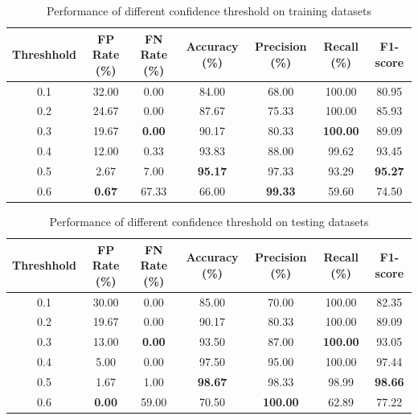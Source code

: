 \documentclass{article}[12pt]
\begin{document}
\begin{table}[H]
    \centering
    \caption{Performance of different confidence threshold on training datasets}
    \begin{tabular}{@{}ccccccc@{}}
    \toprule
    Threshhold & FP Rate (\%)  & FN Rate (\%)  & Accuracy (\%)  & Precision (\%) & Recall (\%)     & F1-score       \\ \midrule
    0.1 & 32.00 & 0.00 & 84.00 & 68.00 & 100.00 & 80.95 \\
    0.2 & 24.67 & 0.00 & 87.67 & 75.33 & 100.00 & 85.93 \\
    0.3        & 19.67         & \textbf{0.00} & 90.17          & 80.33          & \textbf{100.00} & 89.09          \\
    0.4        & 12.00         & 0.33          & 93.83          & 88.00          & 99.62           & 93.45          \\
    0.5        & 2.67          & 7.00          & \textbf{95.17} & 97.33          & 93.29           & \textbf{95.27} \\
    0.6        & \textbf{0.67} & 67.33         & 66.00          & \textbf{99.33} & 59.60           & 74.50          \\ \bottomrule
    \end{tabular}
    \label{tab: yolo_train}
\end{table}

\begin{table}[H]
    \centering
    \caption{Performance of different confidence threshold on testing datasets}
    \begin{tabular}{@{}ccccccc@{}}
    \toprule
    Threshhold & FP Rate (\%)  & FN Rate (\%)  & Accuracy (\%)  & Precision (\%)  & Recall (\%)     & F1-score       \\ \midrule
    0.1 & 30.00 & 0.00 & 85.00 & 70.00 & 100.00 & 82.35 \\
    0.2 & 19.67 & 0.00 & 90.17 & 80.33 & 100.00 & 89.09 \\
    0.3        & 13.00         & \textbf{0.00} & 93.50          & 87.00           & \textbf{100.00} & 93.05          \\
    0.4        & 5.00          & 0.00          & 97.50          & 95.00           & 100.00          & 97.44          \\
    0.5        & 1.67          & 1.00          & \textbf{98.67} & 98.33           & 98.99           & \textbf{98.66} \\
    0.6        & \textbf{0.00} & 59.00         & 70.50          & \textbf{100.00} & 62.89           & 77.22          \\ \bottomrule
    \end{tabular}
    \label{tab: yolo_test}
\end{table}
\end{document}

